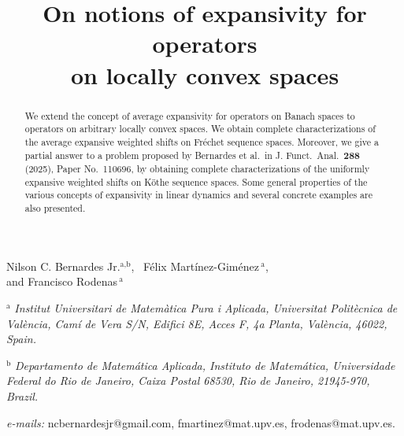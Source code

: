 \documentclass[12pt]{amsart}
\theoremstyle{theorem}
\theoremstyle{definition}
\theoremstyle{remark} \theoremstyle{question} \theoremstyle{example}
\begin{document}
\title[On notions of expansivity for operators on locally convex spaces]
{On notions of expansivity for operators\\ on locally convex spaces}

\date{}
\dedicatory{}
\maketitle

\begin{center}
{\sc Nilson C. Bernardes Jr.}$^\text{a,b}$, \ {\sc F\'elix Mart\'inez-Gim\'enez}$\,^\text{a}$,\\ {\sc and Francisco Rodenas}$\,^\text{a}$
\end{center}

\bigskip\bigskip
{\small\noindent
$^\text{a}$ {\it Institut Universitari de Matem\`atica Pura i Aplicada, Universitat Polit\`ecnica de Val\`encia,
Cam\'i de Vera S/N, Edifici 8E, Acces F, 4a Planta, Val\`encia, 46022, Spain.}

\smallskip\noindent
$^\text{b}$ {\it Departamento de Matem\'atica Aplicada, Instituto de Matem\'atica, Universidade Federal do Rio de Janeiro,
Caixa Postal 68530, Rio de Janeiro, 21945-970, Brazil.}

\smallskip\noindent
{\it e-mails:} ncbernardesjr@gmail.com, fmartinez@mat.upv.es, frodenas@mat.upv.es.}

\bigskip

\begin{abstract}
We extend the concept of average expansivity for operators on Banach spaces to operators on arbitrary locally convex spaces.
We obtain complete characterizations of the average expansive weighted shifts on Fr\'echet sequence spaces.
Moreover, we give a partial answer to a problem proposed by Bernardes et al.\ in J. Funct.\ Anal.\ {\bf 288} (2025), Paper No.\ 110696,
by obtaining complete characterizations of the uniformly expansive weighted shifts on K\"othe sequence spaces.
Some general properties of the various concepts of expansivity in linear dynamics and several concrete examples are also presented.
\end{abstract}

\end{document}
